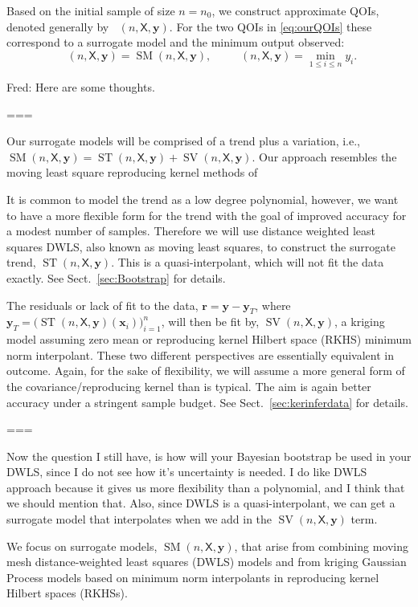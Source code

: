 \documentclass[11pt]{NSFamsart}
\DeclareMathOperator{\QOI}{QOI} %
\DeclareMathOperator{\APP}{\widehat{\QOI}}
\DeclareMathOperator{\SURR}{SM} %
\DeclareMathOperator{\STREND}{ST} %
\DeclareMathOperator{\SVAR}{SV} %
\newcommand{\DWLS}{\textrm{DWLS}\xspace} %
\DeclareMathOperator{\MIN}{MIN}
\DeclareMathOperator{\ID}{ID}
\DeclareMathOperator{\APPMIN}{\widehat{\MIN}}
\DeclareMathOperator{\APPID}{\widehat{\ID}}
\newcommand{\mX}{\mathsf{X}}
\newcommand{\bx}{{\boldsymbol{x}}}
\newcommand{\br}{{\boldsymbol{r}}}
\newcommand{\by}{{\boldsymbol{y}}}
\newcommand{\FJHNote}[1]{{\color{blue}Fred: #1}}
\begin{document}
Based on the initial sample of size $n=n_0$, we construct approximate QOIs, denoted generally by  $\APP(n,\mX,\by)$.  For the two QOIs in \eqref{eq:ourQOIs} these correspond to a surrogate model and the minimum output observed:
\begin{equation} \label{eq:QOIhat}
    \APPID(n,\mX,\by) = \SURR(n,\mX,\by), \qquad \APPMIN(n,\mX,\by) = \min_{1 \le i \le n} y_i.
\end{equation}

\FJHNote{Here are some thoughts.  

===

Our surrogate models will be comprised of a trend plus a variation, i.e., $\SURR(n,\mX,\by) = \STREND(n,\mX,\by) + \SVAR(n,\mX,\by)$. Our approach resembles the moving least square reproducing kernel methods of \cite{liumovingpartI1997,limovingpartII1996}

It is common to model the trend as a low degree polynomial, however, we want to have a more flexible form for the trend with the goal of improved accuracy for a modest number of samples.  Therefore we will use distance weighted least squares \DWLS, also known as moving least squares,  to construct the surrogate trend, $\STREND(n,\mX,\by)$.  This is a quasi-interpolant, which will not fit the data exactly. See Sect.\ \ref{sec:Bootstrap} for details.

The residuals or lack of fit to the data, $\br = \by - \by_T$, where $\by_T = \bigl( \STREND(n,\mX,\by)(\bx_i) \bigr)_{i=1}^n$, will then be fit by, $\SVAR(n,\mX,\by)$, a kriging model assuming zero mean or reproducing kernel Hilbert space (RKHS) minimum norm interpolant.  These two different perspectives are essentially equivalent in outcome.  Again, for the sake of flexibility, we will assume a more general form of the covariance/reproducing kernel than is typical.  The aim is again better accuracy under a stringent sample budget. See Sect.\ \ref{sec:kerinferdata} for details.  

===

Now the question I still have, is how will your Bayesian bootstrap be used in your \DWLS, since I do not see how it's uncertainty is needed.  I do like \DWLS approach because it gives us more flexibility than a polynomial, and I think that we should mention that.  Also, since \DWLS is a quasi-interpolant, we can get a surrogate model that interpolates when we add in the $\SVAR(n,\mX,\by)$ term.   }

We focus on surrogate models, $\SURR(n,\mX,\by)$, that arise from combining moving mesh distance-weighted least squares (DWLS) models \cite{mederos2003moving} and from kriging Gaussian Process models \cite{} based on minimum norm interpolants in reproducing kernel Hilbert spaces (RKHSs).  
\end{document}
